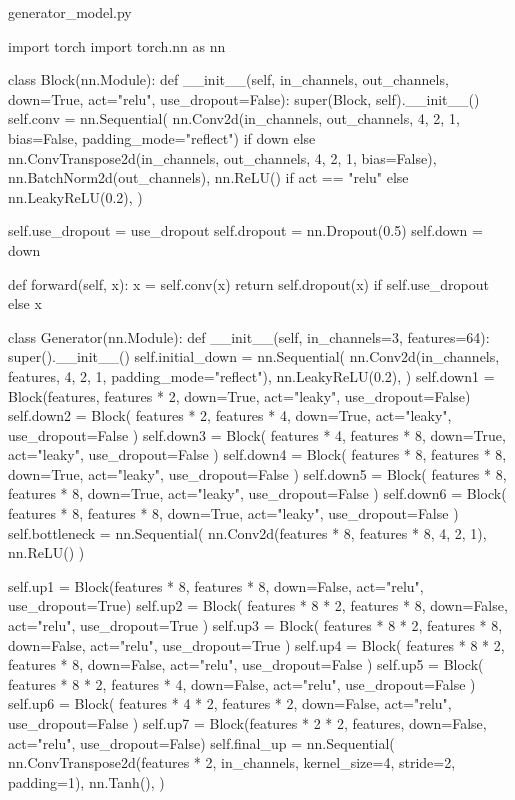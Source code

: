 generator_model.py 

import torch
import torch.nn as nn


class Block(nn.Module):
    def __init__(self, in_channels, out_channels, down=True, act="relu", use_dropout=False):
        super(Block, self).__init__()
        self.conv = nn.Sequential(
            nn.Conv2d(in_channels, out_channels, 4, 2, 1, bias=False, padding_mode="reflect")
            if down
            else nn.ConvTranspose2d(in_channels, out_channels, 4, 2, 1, bias=False),
            nn.BatchNorm2d(out_channels),
            nn.ReLU() if act == "relu" else nn.LeakyReLU(0.2),
        )

        self.use_dropout = use_dropout
        self.dropout = nn.Dropout(0.5)
        self.down = down

    def forward(self, x):
        x = self.conv(x)
        return self.dropout(x) if self.use_dropout else x


class Generator(nn.Module):
    def __init__(self, in_channels=3, features=64):
        super().__init__()
        self.initial_down = nn.Sequential(
            nn.Conv2d(in_channels, features, 4, 2, 1, padding_mode="reflect"),
            nn.LeakyReLU(0.2),
        )
        self.down1 = Block(features, features * 2, down=True, act="leaky", use_dropout=False)
        self.down2 = Block(
            features * 2, features * 4, down=True, act="leaky", use_dropout=False
        )
        self.down3 = Block(
            features * 4, features * 8, down=True, act="leaky", use_dropout=False
        )
        self.down4 = Block(
            features * 8, features * 8, down=True, act="leaky", use_dropout=False
        )
        self.down5 = Block(
            features * 8, features * 8, down=True, act="leaky", use_dropout=False
        )
        self.down6 = Block(
            features * 8, features * 8, down=True, act="leaky", use_dropout=False
        )
        self.bottleneck = nn.Sequential(
            nn.Conv2d(features * 8, features * 8, 4, 2, 1), nn.ReLU()
        )

        self.up1 = Block(features * 8, features * 8, down=False, act="relu", use_dropout=True)
        self.up2 = Block(
            features * 8 * 2, features * 8, down=False, act="relu", use_dropout=True
        )
        self.up3 = Block(
            features * 8 * 2, features * 8, down=False, act="relu", use_dropout=True
        )
        self.up4 = Block(
            features * 8 * 2, features * 8, down=False, act="relu", use_dropout=False
        )
        self.up5 = Block(
            features * 8 * 2, features * 4, down=False, act="relu", use_dropout=False
        )
        self.up6 = Block(
            features * 4 * 2, features * 2, down=False, act="relu", use_dropout=False
        )
        self.up7 = Block(features * 2 * 2, features, down=False, act="relu", use_dropout=False)
        self.final_up = nn.Sequential(
            nn.ConvTranspose2d(features * 2, in_channels, kernel_size=4, stride=2, padding=1),
            nn.Tanh(),
        )

